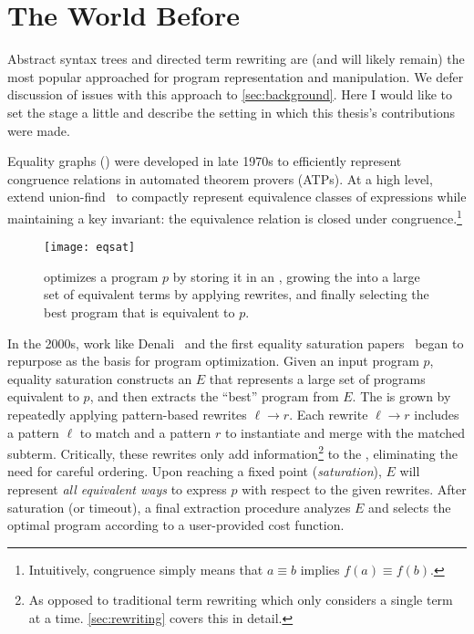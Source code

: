 \section{The World Before \egg}

Abstract syntax trees and
 directed term rewriting
 are (and will likely remain)
 the most popular approached
 for program representation and manipulation.
We defer discussion of issues with this approach to
 \autoref{sec:background}.
Here I would like to set the stage a little
 and describe the
 setting in which this
 thesis's contributions were made.

Equality graphs (\egraphs) were developed in late 1970s to
  efficiently represent congruence relations
  in automated theorem provers (ATPs).
At a high level, \egraphs~\cite{nelson, pp-congr}
  extend union-find~\cite{unionfind} to compactly represent
  equivalence classes of expressions while
  maintaining a key invariant:
  the equivalence relation is closed under congruence.\footnote{
    Intuitively, congruence simply means
    that $a \equiv b$ implies $f(a) \equiv f(b)$.}

\begin{figure}
  \centering
  \texttt{[image: eqsat]}
  \caption{
    \Eqsat optimizes a program $p$ by storing it in an \egraph,
    growing the \egraph into a large set of equivalent terms
    by applying rewrites,
    and finally selecting the best program that is equivalent to $p$.
  }
  \label{fig:eqsat-flow}
\end{figure}

In the 2000s, work like Denali~\cite{denali} and
 the first equality saturation papers~\cite{eqsat, eqsat-llvm}
 began to repurpose \egraphs as the basis for program optimization.
Given an input program $p$,
  equality saturation constructs an \egraph $E$ that
  represents a large set of programs equivalent to $p$,
  and then extracts the ``best'' program from $E$.
The \egraph is grown by repeatedly applying
  pattern-based rewrites $\ell \to r$.
Each rewrite $\ell \to r$ includes
 a pattern $\ell$ to match and
 a pattern $r$ to instantiate and merge
 with the matched subterm.
Critically, these rewrites only add information\footnote{
  As opposed to traditional term rewriting which only considers a
    single term at a time.
  \autoref{sec:rewriting} covers this in detail.
}
  to the \egraph,
  eliminating the need for careful ordering.
Upon reaching a fixed point (\textit{saturation}),
  $E$ will represent \textit{all equivalent ways} to
  express $p$ with respect to the given rewrites.
After saturation (or timeout),
  a final extraction procedure
  analyzes $E$ and selects the
  optimal program according to
  a user-provided cost function.

